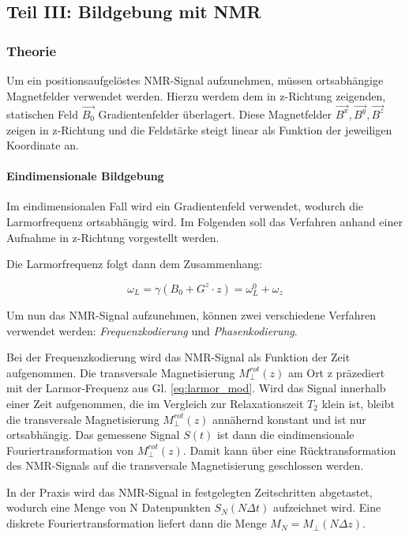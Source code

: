 \documentclass[a4paper]{scrartcl} %
\begin{document}
\newpage

\subsection{Teil III: Bildgebung mit NMR}

\subsubsection{Theorie}

Um ein positionsaufgelöstes NMR-Signal aufzunehmen, müssen ortsabhängige Magnetfelder verwendet werden. Hierzu werdem dem in z-Richtung zeigenden, statischen Feld $\vec{B_0}$ Gradientenfelder überlagert. Diese Magnetfelder $\vec{B^x}, \vec{B^y}, \vec{B^z}$ zeigen in z-Richtung und die Feldstärke steigt linear als Funktion der jeweiligen Koordinate an.

\paragraph{Eindimensionale Bildgebung}

Im eindimensionalen Fall wird ein Gradientenfeld verwendet, wodurch die Larmorfrequenz ortsabhängig wird. Im Folgenden soll das Verfahren anhand einer Aufnahme in z-Richtung vorgestellt werden.

Die Larmorfrequenz folgt dann dem Zusammenhang:

\begin{equation}
\omega_L = \gamma (B_0 + G^z \cdot z) = \omega_L^0 + \omega_z
\label{eq:larmor_mod}
\end{equation}

Um nun das NMR-Signal aufzunehmen, können zwei verschiedene Verfahren verwendet werden: \textit{Frequenzkodierung} und \textit{Phasenkodierung}.

Bei der Frequenzkodierung wird das NMR-Signal als Funktion der Zeit aufgenommen. Die transversale Magnetisierung $M_{\perp}^{rot}(z)$ am Ort z präzediert mit der Larmor-Frequenz aus Gl. \eqref{eq:larmor_mod}. Wird das Signal innerhalb einer Zeit aufgenommen, die im Vergleich zur Relaxationszeit $T_2$ klein ist, bleibt die transversale Magnetisierung $M_{\perp}^{rot}(z)$ annähernd konstant und ist nur ortsabhängig. Das gemessene Signal $S(t)$ ist dann die eindimensionale Fouriertransformation von $M_{\perp}^{rot}(z)$. Damit kann über eine Rücktransformation des NMR-Signals auf die transversale Magnetisierung geschlossen werden.

In der Praxis wird das NMR-Signal in festgelegten Zeitschritten abgetastet, wodurch eine Menge von N Datenpunkten ${S_N(N \Delta t)}$ aufzeichnet wird. Eine diskrete Fouriertransformation liefert dann die Menge $M_N=M_{\perp}(N \Delta z)$.
\end{document}
